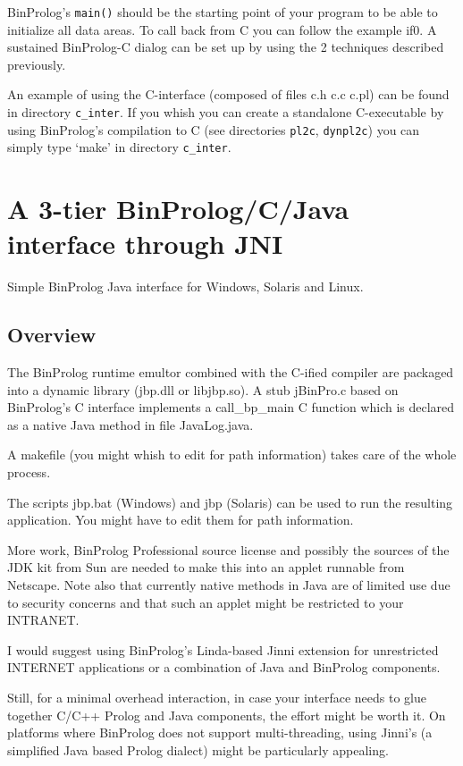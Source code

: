 \documentclass{article}
\begin{document}
BinProlog's {\tt main()} should be the starting point of your program
to be able to initialize all data areas. To call back from C you
can follow the example if0. A sustained BinProlog-C dialog
can be set up by using the 2 techniques described previously.

An example of using the C-interface (composed of files c.h c.c c.pl)
can be found in directory {\tt c\_inter}.
 If you whish you can create
a standalone C-executable by using BinProlog's compilation to C
(see directories {\tt pl2c}, {\tt dynpl2c}) you can
simply type `make' in directory  {\tt c\_inter}.

\section{A 3-tier BinProlog/C/Java interface through JNI}


Simple BinProlog Java interface for Windows, Solaris and Linux.

\subsection{Overview}

The BinProlog runtime emultor combined with the C-ified
compiler are packaged into a dynamic library (jbp.dll or libjbp.so).
A stub jBinPro.c based on BinProlog's C interface
implements a call\_bp\_main C function which is
declared as a native Java method in file JavaLog.java. 

A makefile (you might whish to edit for path information)
takes care of the whole process.

The scripts jbp.bat (Windows) and jbp (Solaris)
can be used to run the resulting application.
You might have to edit them for path information.

More work, BinProlog Professional source license and possibly the sources
of the JDK kit from Sun are needed to make this into an applet runnable
from Netscape. Note also that currently native methods in Java are of
limited use due to security concerns and that such an applet might be
restricted to your INTRANET.

I would suggest using BinProlog's Linda-based Jinni extension
for unrestricted INTERNET applications or a combination of Java
and BinProlog components.

Still, for a minimal overhead interaction, in case your interface
needs to glue together C/C++ Prolog and Java components, the effort
might be worth it. On platforms where BinProlog does not support
multi-threading, using Jinni's (a simplified Java based Prolog dialect)
might be particularly appealing.
\end{document}
